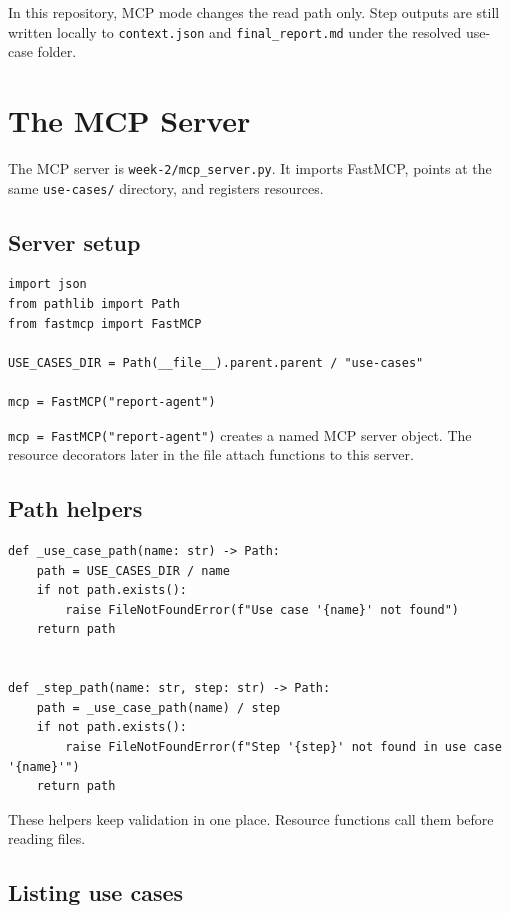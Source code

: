 \documentclass[12pt, a4paper]{article}
\begin{document}
\begin{warnbox}
In this repository, MCP mode changes the read path only. Step outputs are still written locally to \texttt{context.json} and \texttt{final\_report.md} under the resolved use-case folder.
\end{warnbox}

\section{The MCP Server}

The MCP server is \texttt{week-2/mcp\_server.py}. It imports FastMCP, points at the same \texttt{use-cases/} directory, and registers resources.

\subsection{Server setup}

\begin{lstlisting}[style=pythonstyle]
import json
from pathlib import Path
from fastmcp import FastMCP

USE_CASES_DIR = Path(__file__).parent.parent / "use-cases"

mcp = FastMCP("report-agent")
\end{lstlisting}

\texttt{mcp = FastMCP("report-agent")} creates a named MCP server object. The resource decorators later in the file attach functions to this server.

\subsection{Path helpers}

\begin{lstlisting}[style=pythonstyle]
def _use_case_path(name: str) -> Path:
    path = USE_CASES_DIR / name
    if not path.exists():
        raise FileNotFoundError(f"Use case '{name}' not found")
    return path


def _step_path(name: str, step: str) -> Path:
    path = _use_case_path(name) / step
    if not path.exists():
        raise FileNotFoundError(f"Step '{step}' not found in use case '{name}'")
    return path
\end{lstlisting}

These helpers keep validation in one place. Resource functions call them before reading files.

\subsection{Listing use cases}
\end{document}
